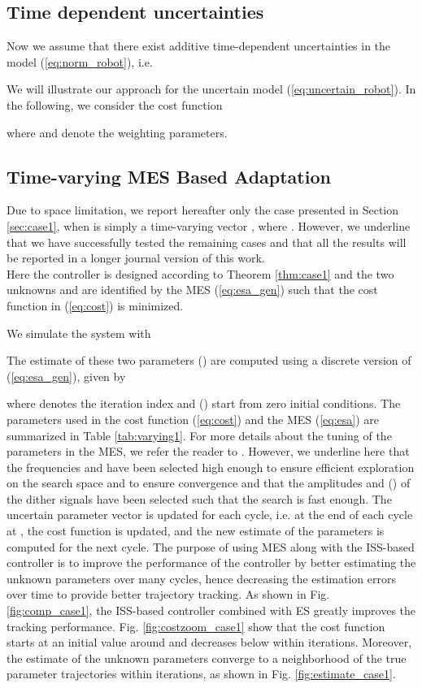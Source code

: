 \documentclass[twoside,leqno,onecolumn]{article}
\begin{document}
\subsection{Time dependent uncertainties}
Now we assume that there exist additive time-dependent
uncertainties in the model (\ref{eq:norm_robot}), i.e.

We will illustrate our approach for the uncertain model
(\ref{eq:uncertain_robot}). In the following, we consider the cost
function

where  and  denote the weighting parameters.



\subsection{Time-varying MES Based Adaptation}
\label{sec:constant} Due to space limitation, we report hereafter
only the case presented in Section \ref{sec:case1}, when  is simply a time-varying vector , where
. However, we underline
that we have successfully tested the remaining cases and that all
the results will be reported in a longer journal version of
this work.\\
Here the controller is designed according to Theorem
\ref{thm:case1} and the two unknowns  and
 are identified by the MES (\ref{eq:esa_gen}) such
that the cost function  in (\ref{eq:cost}) is minimized.

We simulate the system with

The estimate of these two parameters  () are computed using a discrete version of (\ref{eq:esa_gen}),
given by

where  denotes the iteration index and
 () start from zero initial
conditions. The parameters used in the cost function
(\ref{eq:cost}) and the MES (\ref{eq:esa}) are summarized in Table
\ref{tab:varying1}. For more details about the tuning of the
parameters in the MES, we refer the reader to \cite{Ariy03}.
However, we underline here that the frequencies  and
 have been selected high enough to ensure efficient
exploration on the search space and to ensure convergence and that
the amplitudes  and  () of the dither
signals have been selected such that the search is fast enough.
The uncertain parameter vector  is updated for
each cycle, i.e. at the end of each cycle at , the cost
function  is updated, and the new estimate of the parameters is
computed for the next cycle. The purpose of using MES along with
the ISS-based controller is to improve the performance of the
controller by better estimating the unknown parameters over many
cycles, hence decreasing the estimation errors over time to
provide better trajectory tracking. As shown in Fig.
\ref{fig:comp_case1}, the ISS-based controller combined with ES
greatly improves the tracking performance. Fig.
\ref{fig:costzoom_case1} show that the cost function starts at an
initial value around  and decreases below  within 
iterations. Moreover, the estimate of the unknown parameters
converge to a neighborhood of the true parameter trajectories
within  iterations, as shown in Fig.
\ref{fig:estimate_case1}.
\end{document}
